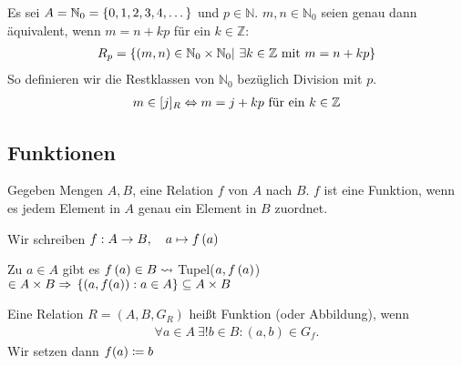 \begin{beispiel}
    Es sei $A = \mathbb{N}_{0} = \left\{0,1,2,3,4,\dots\right\}$ und $p\in \mathbb{N}$. $m,n\in\mathbb{N}_0$ seien genau dann äquivalent, wenn $m=n+kp$ für ein $k\in\mathbb{Z}$:
    \begin{align*}
        R_{p} = \left\{\left(m,n\right)\in \mathbb{N}_0 \times \mathbb{N}_0 |~\exists k\in \mathbb{Z}\text{ mit } m=n+kp\right\}
    \end{align*}
    So definieren wir die Restklassen von $\mathbb{N}_0$ bezüglich Division mit $p$.
    \begin{align*}
        m\in [j]_{R} \Leftrightarrow{} m=j+kp\text{ für ein }k\in\mathbb{Z}
    \end{align*}
\end{beispiel}


\subsection{Funktionen}

\begin{bemerkung}
    Gegeben Mengen $A, B$, eine Relation $f$ von $A$ nach $B$. $f$ ist eine Funktion, wenn es jedem Element in $A$ genau ein Element in $B$ zuordnet.
\end{bemerkung}

\begin{notation}[Pfeilnotation]
    Wir schreiben $f: A \rightarrow{} B,\quad a\mapsto f\left(a\right)$
\end{notation}
\begin{folgerung}
    Zu $a\in A$ gibt es $f\left(a\right)\in B \leadsto$ Tupel($a, f\left(a\right)$) $\in A\times B \Rightarrow{} \left\{\left(a, f(a)\right): a\in A\right\} \subseteq A\times B$
\end{folgerung}

\begin{definition}[Funktion]
    Eine Relation $R = (A, B, G_R)$ heißt Funktion (oder Abbildung), wenn
    \begin{align*}
        \forall a\in A~\exists! b\in B: (a,b)\in G_f.
    \end{align*}
    Wir setzen dann $f(a)\coloneqq b$
\end{definition}

